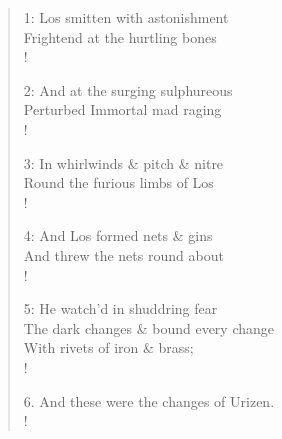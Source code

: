 \documentclass[9pt]{extarticle}
\begin{document}
\begin{verse}
\begin{altverse} 
		
		1: Los smitten with astonishment\\
		Frightend at the hurtling bones\\!
		
		2: And at the surging sulphureous\\
		Perturbed Immortal mad raging\\!
		
		3: In whirlwinds \& pitch \& nitre\\
		Round the furious limbs of Los\\!
		
		4: And Los formed nets \& gins\\
		And threw the nets round about\\!
		
		5: He watch'd in shuddring fear\\
		The dark changes \& bound every change\\
		With rivets of iron \& brass;\\!
		
		6. And these were the changes of Urizen.\\!
		
\end{altverse}
\end{verse}	
\end{document}
